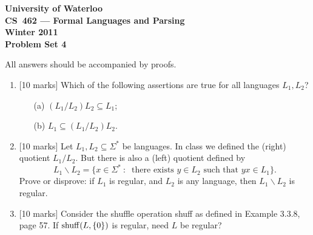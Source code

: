 \documentclass[12pt]{article}
\begin{document}
\begin{center}
\large\bf University of Waterloo\\
CS~462 --- Formal Languages and Parsing\\
Winter 2011\\
Problem Set 4\\
\end{center}

\bigskip


\smallskip


\bigskip\bigskip

All answers should be accompanied by proofs.

\begin{enumerate}

\item{} [10 marks]
Which of the following assertions
are true for all languages $L_1, L_2$?
\begin{itemize}
\item[(a)] $(L_1/L_2)L_2 \subseteq L_1$;

\item[(b)] $L_1\subseteq (L_1/L_2)L_2$.
\end{itemize}

\item{} [10 marks]
Let $L_1, L_2 \subseteq \Sigma^*$ be languages.  In class we defined the
(right) quotient $L_1/L_2$.  But there is also a (left)
quotient defined by
$$L_1 \backslash L_2 = \lbrace x \in \Sigma^* \ : \ 
	\text{ there exists } y \in L_2 \text{ such that }
		yx \in L_1 \rbrace .$$
Prove or disprove: if $L_1$ is regular, and $L_2$ is any language,
then $L_1 \backslash L_2$ is regular.

\item{} [10 marks]
Consider the shuffle operation
{\rm shuff} as defined in Example 3.3.8, page 57.
If ${\rm shuff}(L, \lbrace 0 \rbrace)$ is regular, need $L$ be regular?

\end{enumerate}
\end{document}
